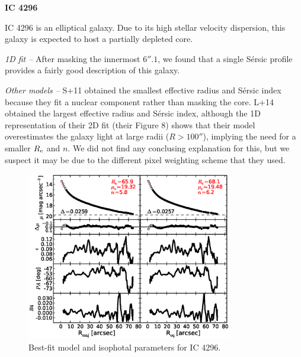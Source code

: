 \documentclass[preprint2]{emulateapj}
\newcommand{\fitfigurewidth}{0.8\textwidth}
\begin{document}
  \clearpage\newpage\noindent
  {\bf IC 4296 \\}

  IC 4296 is an elliptical galaxy. 
  Due to its high stellar velocity dispersion, this galaxy is expected to host a partially depleted core. 

  \emph{1D fit -- }
  After masking the innermost $6''.1$, 
  we found that a single S\'ersic profile provides a fairly good description of this galaxy.
  
  \emph{Other models -- } 
  S+11 obtained the smallest effective radius and S\'ersic index because they fit a nuclear component rather than masking the core. 
  L+14 obtained the largest effective radius and S\'ersic index, 
  although the 1D representation of their 2D fit (their Figure 8) shows that their model overestimates the galaxy light at large radii ($R > 100''$), 
  implying the need for a smaller $R_{\rm e}$ and $n$. 
  We did not find any conclusing explanation for this, 
  but we suspect it may be due to the different pixel weighting scheme that they used.
  

  \begin{figure}[h]
  \begin{center}
  \includegraphics[width=\fitfigurewidth]{images/ic4296_1Dfit.eps}
  \caption{Best-fit model and isophotal parameters for IC 4296.}
  \end{center}
  \end{figure}
\end{document}
